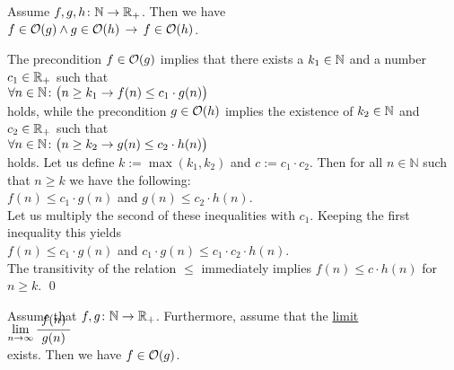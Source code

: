 \begin{Proposition} 
Assume $f,g,h \colon {\mathbb N} \rightarrow {{\mathbb R}_+}$. Then we have \\[0.2cm]
\hspace*{1.3cm}
 $f \in \mathcal{O}(g) \wedge g \in \mathcal{O}(h) \,\rightarrow\, f \in \mathcal{O}(h)$.

\end{Proposition}

\proof
The precondition $f \in \mathcal{O}(g)$ implies that there exists a $k_1 \in {\mathbb N}$ and a number $c_1 \in {\mathbb R}_+$
such that 
\\[0.2cm]
\hspace*{1.3cm} 
$\forall n \in {\mathbb N} \colon\bigl( n \geq k_1 \rightarrow f(n) \leq c_1 \cdot g(n)\bigr)$ 
\\[0.2cm]
holds, while the precondition $g \in \mathcal{O}(h)$ implies the existence of $k_2 \in {\mathbb N}$ and $c_2 \in {\mathbb R}_+$
such that \\[0.2cm]
\hspace*{1.3cm} 
$\forall n \in {\mathbb N} \colon\bigl( n \geq k_2 \rightarrow g(n) \leq c_2 \cdot h(n)\bigr)$ 
\\[0.2cm]
holds.  Let us define $k:= \max(k_1,k_2)$ and $c := c_1 \cdot c_2$.  Then for all $n \in \mathbb{N}$
such that $n \geq k$ we have the following:
\\[0.2cm]
\hspace*{1.3cm}
$f(n) \leq c_1\cdot g(n)$ \quad and \quad $g(n) \leq c_2 \cdot h(n)$. 
\\[0.2cm]
Let us multiply the second of these inequalities with $c_1$.  Keeping the first inequality this yields
\\[0.2cm]
\hspace*{1.3cm}
$f(n) \leq c_1\cdot g(n)$  \quad and \quad $c_1\cdot g(n) \leq c_1\cdot c_2 \cdot h(n)$. 
\\[0.2cm]
The transitivity of the relation $\leq$ immediately implies $f(n) \leq c \cdot h(n)$ for $n \geq k$.  
\qed

\begin{Proposition}  \label{limit}
  Assume that $f,g \colon {\mathbb N} \rightarrow {{\mathbb R}_+}$.   Furthermore, assume that the \href{https://en.wikipedia.org/wiki/Limit_(mathematics)#Limit_of_a_sequence}{limit}
  \\[0.3cm]
  \hspace*{3.3cm}
 $\lim\limits_{n \rightarrow \infty} \bruch{\,f(n)\,}{g(n)}$
  \\[0.2cm]
  exists.  Then we have $f \in \mathcal{O}(g)$. 
\end{Proposition}

